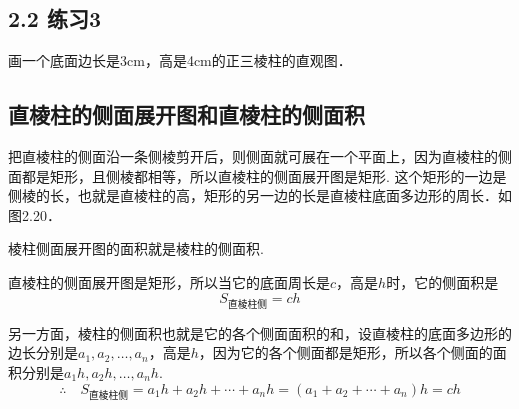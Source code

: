 \subsection*{2.2 练习3}
画一个底面边长是3cm，高是4cm的正三棱柱的直观图．

\subsection{直棱柱的侧面展开图和直棱柱的侧面积}
把直棱柱的侧面沿一条侧棱剪开后，则侧面就可展在一个平面上，因为直棱柱的侧面都是矩形，且侧棱都相等，所以直棱柱的侧面展开图是矩形. 这个矩形的一边是侧棱的长，也就是直棱柱的高，矩形的另一边的长是直棱柱底面多边形的周长．如图2.20．

\begin{figure}[htp]
    \centering
{}
    \caption{}
\end{figure}
 
棱柱侧面展开图的面积就是棱柱的侧面积.

直棱柱的侧面展开图是矩形，所以当它的底面周长是$c$，高是$h$时，它的侧面积是
\[S_{\text{直棱柱侧}}=ch\]

另一方面，棱柱的侧面积也就是它的各个侧面面积的和，设直棱柱的底面多边形的边长分别是$a_1,a_2,\ldots,a_n$，高是$h$，因为它的各个侧面都是矩形，所以各个侧面的面积分别是$a_1h,a_2h,\ldots,a_nh$.
\[\therefore\quad S_{\text{直棱柱侧}}=a_1h+a_2h+\cdots+a_nh=(a_1+a_2+\cdots+a_n)h=ch\]

